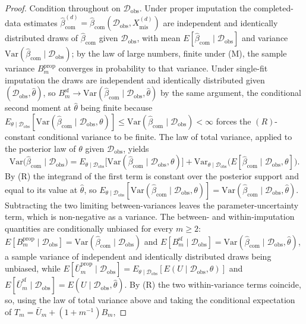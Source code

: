 \begin{proof}
Condition throughout on $\mathcal{D}_{\mathrm{obs}}$. Under proper imputation the completed-data estimates $\hat{\beta}^{(d)}_{\mathrm{com}}=\hat{\beta}_{\mathrm{com}}(\mathcal{D}_{\mathrm{obs}},X_{\mathrm{mis}}^{(d)})$ are independent and identically distributed draws of $\hat{\beta}_{\mathrm{com}}$ given $\mathcal{D}_{\mathrm{obs}}$, with mean $E[\hat{\beta}_{\mathrm{com}}\mid\mathcal{D}_{\mathrm{obs}}]$ and variance $\mathrm{Var}(\hat{\beta}_{\mathrm{com}}\mid\mathcal{D}_{\mathrm{obs}})$; by the law of large numbers, finite under (M), the sample variance $B_m^{\mathrm{prop}}$ converges in probability to that variance. Under single-fit imputation the draws are independent and identically distributed given $(\mathcal{D}_{\mathrm{obs}},\hat{\theta})$, so $B_m^{\mathrm{sf}}\to\mathrm{Var}(\hat{\beta}_{\mathrm{com}}\mid\mathcal{D}_{\mathrm{obs}},\hat{\theta})$ by the same argument, the conditional second moment at $\hat{\theta}$ being finite because $E_{\theta\mid\mathcal{D}_{\mathrm{obs}}}[\mathrm{Var}(\hat{\beta}_{\mathrm{com}}\mid\mathcal{D}_{\mathrm{obs}},\theta)]\le\mathrm{Var}(\hat{\beta}_{\mathrm{com}}\mid\mathcal{D}_{\mathrm{obs}})<\infty$ forces the $(R)$-constant conditional variance to be finite. The law of total variance, applied to the posterior law of $\theta$ given $\mathcal{D}_{\mathrm{obs}}$, yields
\[
\mathrm{Var}\bigl(\hat{\beta}_{\mathrm{com}}\mid\mathcal{D}_{\mathrm{obs}}\bigr)
=E_{\theta\mid\mathcal{D}_{\mathrm{obs}}}\!\bigl[\mathrm{Var}(\hat{\beta}_{\mathrm{com}}\mid\mathcal{D}_{\mathrm{obs}},\theta)\bigr]
+\mathrm{Var}_{\theta\mid\mathcal{D}_{\mathrm{obs}}}\!\bigl(E[\hat{\beta}_{\mathrm{com}}\mid\mathcal{D}_{\mathrm{obs}},\theta]\bigr).
\]
By (R) the integrand of the first term is constant over the posterior support and equal to its value at $\hat{\theta}$, so $E_{\theta\mid\mathcal{D}_{\mathrm{obs}}}[\mathrm{Var}(\hat{\beta}_{\mathrm{com}}\mid\mathcal{D}_{\mathrm{obs}},\theta)]=\mathrm{Var}(\hat{\beta}_{\mathrm{com}}\mid\mathcal{D}_{\mathrm{obs}},\hat{\theta})$. Subtracting the two limiting between-variances leaves the parameter-uncertainty term, which is non-negative as a variance. The between- and within-imputation quantities are conditionally unbiased for every $m\ge2$: $E[B_m^{\mathrm{prop}}\mid\mathcal{D}_{\mathrm{obs}}]=\mathrm{Var}(\hat{\beta}_{\mathrm{com}}\mid\mathcal{D}_{\mathrm{obs}})$ and $E[B_m^{\mathrm{sf}}\mid\mathcal{D}_{\mathrm{obs}}]=\mathrm{Var}(\hat{\beta}_{\mathrm{com}}\mid\mathcal{D}_{\mathrm{obs}},\hat{\theta})$, a sample variance of independent and identically distributed draws being unbiased, while $E[\bar{U}_m^{\mathrm{prop}}\mid\mathcal{D}_{\mathrm{obs}}]=E_{\theta\mid\mathcal{D}_{\mathrm{obs}}}[E(U\mid\mathcal{D}_{\mathrm{obs}},\theta)]$ and $E[\bar{U}_m^{\mathrm{sf}}\mid\mathcal{D}_{\mathrm{obs}}]=E(U\mid\mathcal{D}_{\mathrm{obs}},\hat{\theta})$. By (R) the two within-variance terms coincide, so, using the law of total variance above and taking the conditional expectation of $T_m=\bar{U}_m+(1+m^{-1})B_m$,

\end{proof}

